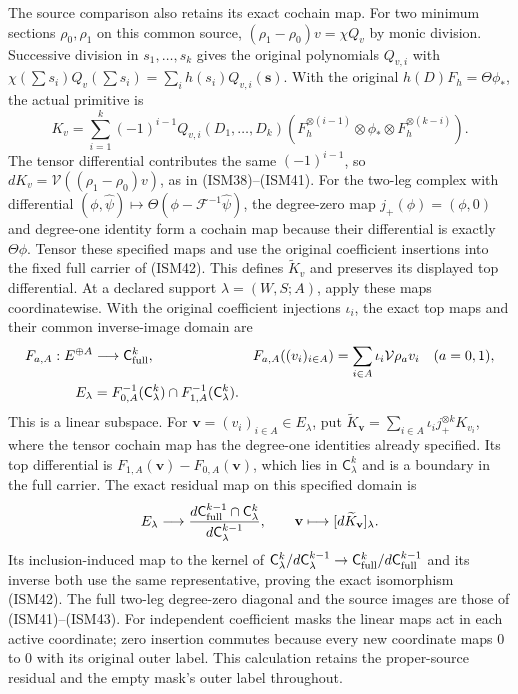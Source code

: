 The source comparison also retains its exact cochain map.
For two minimum sections $\rho_0,\rho_1$ on this common source,
$(\rho_1-\rho_0)v=\chi Q_v$ by monic division. Successive
division in $s_1,\ldots,s_k$ gives the original polynomials
$Q_{v,i}$ with
$\chi(\sum s_i)Q_v(\sum s_i)=\sum_i h(s_i)Q_{v,i}(\mathbf s)$.
With the original $h(D)F_h=\Theta\phi_*$, the actual primitive
is
\[
 K_v=\sum_{i=1}^k(-1)^{i-1}Q_{v,i}(D_1,\ldots,D_k)
 (F_h^{\otimes(i-1)}\otimes\phi_*
                         \otimes F_h^{\otimes(k-i)}).
\]
The tensor differential contributes the same $(-1)^{i-1}$,
so $dK_v=\mathcal V((\rho_1-\rho_0)v)$, as in (ISM38)--(ISM41).
For the two-leg complex with differential
$(\phi,\widehat\psi)\mapsto\Theta(\phi-\mathcal F^{-1}\widehat\psi)$,
the degree-zero map $j_+(\phi)=(\phi,0)$ and degree-one identity
form a cochain map because their differential is exactly
$\Theta\phi$. Tensor these specified maps and use the original
coefficient insertions into the fixed full carrier of (ISM42).
This defines $\widetilde K_v$ and preserves its displayed top
differential. At a declared support $\lambda=(W,S;A)$, apply
these maps coordinatewise. With the original coefficient
injections $\iota_i$, the exact top maps and their common
inverse-image domain are
\[
\begin{aligned}
 F_{a,A}:E^{\oplus A}&\longrightarrow\mathsf C_{\rm full}^k,
 &F_{a,A}((v_i)_{i\in A})&=\sum_{i\in A}\iota_i\mathcal V\rho_av_i
 \quad(a=0,1),\\
 E_\lambda&=
 F_{0,A}^{-1}(\mathsf C_\lambda^k)
 \cap F_{1,A}^{-1}(\mathsf C_\lambda^k).
\end{aligned}
\]
This is a linear subspace. For $\mathbf v=(v_i)_{i\in A}\in E_\lambda$,
put $\widetilde K_{\mathbf v}=\sum_{i\in A}\iota_i j_+^{\otimes k}K_{v_i}$,
where the tensor cochain map has the degree-one identities already
specified. Its top differential is $F_{1,A}(\mathbf v)-F_{0,A}(\mathbf v)$,
which lies in $\mathsf C_\lambda^k$ and is a boundary in the full
carrier. The exact residual map on this specified domain is
\[
 E_\lambda\longrightarrow
 \frac{d\mathsf C_{\rm full}^{k-1}\cap\mathsf C_\lambda^k}
      {d\mathsf C_\lambda^{k-1}},\qquad
 \mathbf v\longmapsto[d\widetilde K_{\mathbf v}]_\lambda .
\]
Its inclusion-induced map to the kernel of
$\mathsf C_\lambda^k/d\mathsf C_\lambda^{k-1}
 \to\mathsf C_{\rm full}^k/d\mathsf C_{\rm full}^{k-1}$
and its inverse both use the same representative, proving the
exact isomorphism (ISM42). The full two-leg degree-zero
diagonal and the source images are those of (ISM41)--(ISM43).
For independent coefficient masks the linear maps act in each
active coordinate; zero insertion commutes because every new
coordinate maps $0$ to $0$ with its original outer label.
This calculation retains the proper-source residual and the
empty mask's outer label throughout.
